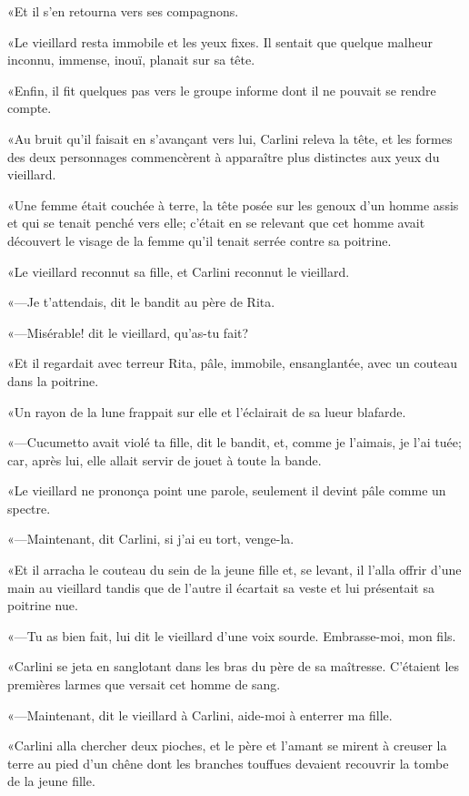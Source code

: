 «Et il s'en retourna vers ses compagnons. 

«Le vieillard resta immobile et les yeux fixes. Il sentait que quelque malheur inconnu, immense, inouï, planait sur sa tête. 

«Enfin, il fit quelques pas vers le groupe informe dont il ne pouvait se rendre compte. 

«Au bruit qu'il faisait en s'avançant vers lui, Carlini releva la tête, et les formes des deux personnages commencèrent à apparaître plus distinctes aux yeux du vieillard. 

«Une femme était couchée à terre, la tête posée sur les genoux d'un homme assis et qui se tenait penché vers elle; c'était en se relevant que cet homme avait découvert le visage de la femme qu'il tenait serrée contre sa poitrine. 

«Le vieillard reconnut sa fille, et Carlini reconnut le vieillard. 

«—Je t'attendais, dit le bandit au père de Rita. 

«—Misérable! dit le vieillard, qu'as-tu fait? 

«Et il regardait avec terreur Rita, pâle, immobile, ensanglantée, avec un couteau dans la poitrine. 

«Un rayon de la lune frappait sur elle et l'éclairait de sa lueur blafarde. 

«—Cucumetto avait violé ta fille, dit le bandit, et, comme je l'aimais, je l'ai tuée; car, après lui, elle allait servir de jouet à toute la bande. 

«Le vieillard ne prononça point une parole, seulement il devint pâle comme un spectre. 

«—Maintenant, dit Carlini, si j'ai eu tort, venge-la. 

«Et il arracha le couteau du sein de la jeune fille et, se levant, il l'alla offrir d'une main au vieillard tandis que de l'autre il écartait sa veste et lui présentait sa poitrine nue. 

«—Tu as bien fait, lui dit le vieillard d'une voix sourde. Embrasse-moi, mon fils. 

«Carlini se jeta en sanglotant dans les bras du père de sa maîtresse. C'étaient les premières larmes que versait cet homme de sang. 

«—Maintenant, dit le vieillard à Carlini, aide-moi à enterrer ma fille. 

«Carlini alla chercher deux pioches, et le père et l'amant se mirent à creuser la terre au pied d'un chêne dont les branches touffues devaient recouvrir la tombe de la jeune fille. 

